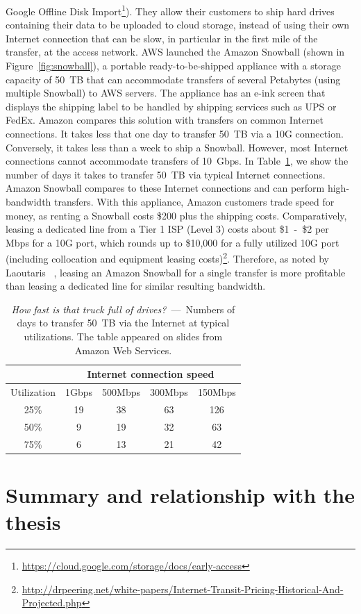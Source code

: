 Google Offline Disk Import\footnote{\url{https://cloud.google.com/storage/docs/early-access}}). They allow their customers to ship hard drives containing their data to be uploaded to cloud storage, instead of using their own Internet connection that can be slow, in particular in the first mile of the transfer, at the access network. AWS launched the Amazon Snowball (shown in Figure~\ref{fig:snowball}), a portable ready-to-be-shipped appliance with a storage capacity of 50~TB that can accommodate transfers of several Petabytes (using multiple Snowball) to AWS servers. The appliance has an e-ink screen that displays the shipping label to be handled by shipping services such as UPS or FedEx. Amazon compares this solution with transfers on common Internet connections. It takes less that one day to transfer 50~TB via a 10G connection. Conversely, it takes less than a week to ship a Snowball. However, most Internet connections cannot accommodate transfers of 10~Gbps. In Table~\ref{tab:truck-full-of-drives}, we show the number of days it takes to transfer 50~TB via typical Internet connections. Amazon Snowball compares to these Internet connections and can perform high-bandwidth transfers. With this appliance, Amazon customers trade speed for money, as renting a Snowball costs \$200 plus the shipping costs. Comparatively, leasing a dedicated line from a Tier 1 ISP (\eg Level 3) costs about \$1~-~\$2 per Mbps for a 10G port, which rounds up to \$10,000 for a fully utilized 10G port (including collocation and equipment leasing costs)\footnote{\url{http://drpeering.net/white-papers/Internet-Transit-Pricing-Historical-And-Projected.php}}. Therefore, as noted by Laoutaris \etal~\cite{laoutaris2009delay}, leasing an Amazon Snowball for a single transfer is more profitable than leasing a dedicated line for similar resulting bandwidth.

\begin{table}[h]
    \centering
    \begin{tabular}{|c|c|c|c|c|}
        \hline
         & \multicolumn{4}{c|}{Internet connection speed} \\
        \hline
        Utilization & 1Gbps & 500Mbps & 300Mbps & 150Mbps\\
        \hline
        25\% & 19 & 38 & 63 & 126 \\
        \hline
        50\% & 9 & 19 & 32 & 63 \\
        \hline
        75\% & 6 & 13 & 21 & 42 \\
        \hline
    \end{tabular}
    \caption{\textit{How fast is that truck full of drives?}~---~Numbers of days to transfer 50~TB via the Internet at typical utilizations. The table appeared on slides from Amazon Web Services.} 
    \label{tab:truck-full-of-drives}
\end{table}


\section{Summary and relationship with the thesis}
\label{sec:summary-relationship-related-work}